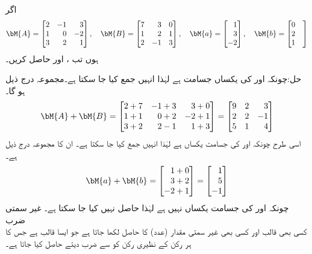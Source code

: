 اگر 
\begin{align*}
\bM{A}=
\begin{bmatrix*}[r]
2&-1&3\\
1&0&-2\\
3&2&1
\end{bmatrix*}
,\quad 
\bM{B}=
\begin{bmatrix*}[r]
7&3&0\\
1&2&1\\
2&-1&3
\end{bmatrix*},\quad
\bM{a}=
\begin{bmatrix*}[r]
1\\
3\\
-2
\end{bmatrix*},\quad
\bM{b}=
\begin{bmatrix*}[r]
0\\
2&\\
1
\end{bmatrix*}
\end{align*}
ہوں تب ،  اور  حاصل کریں۔

حل:چونکہ  اور  کی یکساں جسامت ہے لہٰذا انہیں جمع کیا جا سکتا ہے۔مجموعہ درج ذیل ہو گا۔
\begin{align*}
\bM{A}+\bM{B}=
\begin{bmatrix*}[r]
2+7&-1+3&3+0\\
1+1&0+2&-2+1\\
3+2&2-1&1+3
\end{bmatrix*}
=
\begin{bmatrix*}[r]
9&2&3\\
2&2&-1\\
5&1&4
\end{bmatrix*}
\end{align*}
اسی طرح چونکہ  اور  کی جسامت یکساں ہے لہٰذا انہیں جمع  کیا جا سکتا ہے۔ ان کا مجموعہ درج ذیل ہے۔
\begin{align*}
\bM{a}+\bM{b}=
\begin{bmatrix*}[r]
1+0\\
3+2\\
-2+1
\end{bmatrix*}=
\begin{bmatrix*}[r]
1\\
5\\
-1
\end{bmatrix*}
\end{align*}
چونکہ  اور  کی جسامت یکساں نہیں ہے لہٰذا  حاصل نہیں کیا جا سکتا ہے۔
\quad غیر سمتی ضرب\\
کسی بھی  قالب  اور کسی بھی غیر سمتی مقدار (عدد)  کا حاصل   لکھا جاتا ہے جو ایسا  قالب  ہے جس کا ہر رکن  کے نظیری رکن کو  سے ضرب دیتے حاصل کیا جاتا ہے۔

